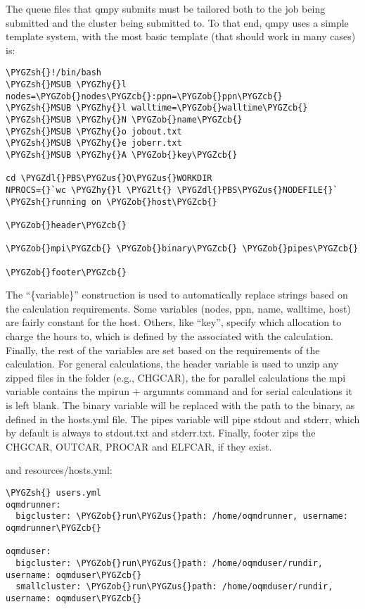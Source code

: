 \documentclass[letterpaper,10pt,english]{sphinxmanual}
\def\PYGZus{\char`\_}
\def\PYGZob{\char`\{}
\def\PYGZcb{\char`\}}
\def\PYGZlt{\char`\<}
\def\PYGZsh{\char`\#}
\def\PYGZdl{\char`\$}
\def\PYGZhy{\char`\-}
\begin{document}
The queue files that qmpy submits must be tailored both to the job being
submitted and the cluster being submitted to. To that end, qmpy uses a simple
template system, with the most basic template (that should work in many cases)
is:

\begin{Verbatim}[commandchars=\\\{\}]
\PYGZsh{}!/bin/bash
\PYGZsh{}MSUB \PYGZhy{}l nodes=\PYGZob{}nodes\PYGZcb{}:ppn=\PYGZob{}ppn\PYGZcb{}
\PYGZsh{}MSUB \PYGZhy{}l walltime=\PYGZob{}walltime\PYGZcb{}
\PYGZsh{}MSUB \PYGZhy{}N \PYGZob{}name\PYGZcb{}
\PYGZsh{}MSUB \PYGZhy{}o jobout.txt
\PYGZsh{}MSUB \PYGZhy{}e joberr.txt
\PYGZsh{}MSUB \PYGZhy{}A \PYGZob{}key\PYGZcb{}

cd \PYGZdl{}PBS\PYGZus{}O\PYGZus{}WORKDIR
NPROCS={}`wc \PYGZhy{}l \PYGZlt{} \PYGZdl{}PBS\PYGZus{}NODEFILE{}`
\PYGZsh{}running on \PYGZob{}host\PYGZcb{}

\PYGZob{}header\PYGZcb{}

\PYGZob{}mpi\PYGZcb{} \PYGZob{}binary\PYGZcb{} \PYGZob{}pipes\PYGZcb{}

\PYGZob{}footer\PYGZcb{}
\end{Verbatim}

The ``\{variable\}'' construction is used to automatically replace strings based on
the calculation requirements. Some variables (nodes, ppn, name, walltime, host)
are fairly constant for the host. Others, like ``key'', specify which allocation
to charge the hours to, which is defined by the {\hyperref[models:qmpy.Allocation]{}}
associated with the calculation. Finally, the rest of the variables are set
based on the requirements of the calculation. For general calculations, the
header variable is used to unzip any zipped files in the folder (e.g., CHGCAR),
the for parallel calculations the mpi variable contains the mpirun + argumnts
command and for serial calculations it is left blank. The binary variable will
be replaced with the path to the binary, as defined in the hosts.yml file. The
pipes variable will pipe stdout and stderr, which by default is always to
stdout.txt and stderr.txt. Finally, footer zips the CHGCAR, OUTCAR, PROCAR and
ELFCAR, if they exist.

and resources/hosts.yml:

\begin{Verbatim}[commandchars=\\\{\}]
\PYGZsh{} users.yml
oqmdrunner:
  bigcluster: \PYGZob{}run\PYGZus{}path: /home/oqmdrunner, username: oqmdrunner\PYGZcb{}

oqmduser:
  bigcluster: \PYGZob{}run\PYGZus{}path: /home/oqmduser/rundir, username: oqmduser\PYGZcb{}
  smallcluster: \PYGZob{}run\PYGZus{}path: /home/oqmduser/rundir, username: oqmduser\PYGZcb{}
\end{Verbatim}
\end{document}
